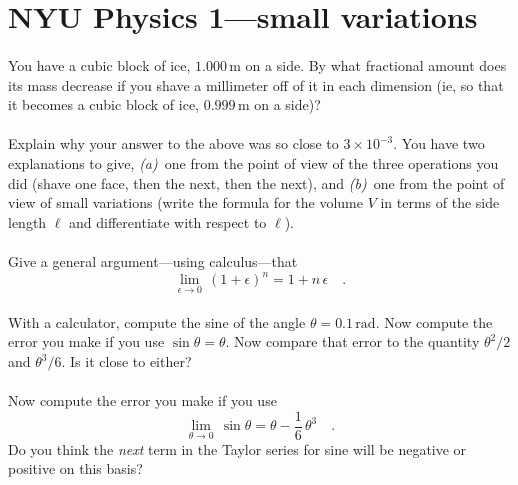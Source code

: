 \documentclass[12pt]{article}
\newcommand{\m}{\mathrm{m}}
\newcommand{\rad}{\mathrm{rad}}
\newcounter{problem}
\begin{document}
\sloppy\sloppypar\raggedbottom\frenchspacing\thispagestyle{empty}

\section*{NYU Physics 1---small variations}

\paragraph{\theproblem}%
You have a cubic block of ice, $1.000\,\m$ on a side.  By what
fractional amount does its mass decrease if you shave a millimeter off
of it in each dimension (ie, so that it becomes a cubic block of ice,
$0.999\,\m$ on a side)?

\paragraph{\theproblem}%
Explain why your answer to the above was so close to $3\times
10^{-3}$.  You have two explanations to give, \textsl{(a)}~one from
the point of view of the three operations you did (shave one face,
then the next, then the next), and \textsl{(b)}~one from the point of
view of small variations (write the formula for the volume $V$ in
terms of the side length $\ell$ and differentiate with respect to
$\ell$).

\paragraph{\theproblem}%
Give a general argument---using calculus---that
\begin{equation}
\lim_{\epsilon\rightarrow 0}\,(1+\epsilon)^n=1+n\,\epsilon \quad .
\end{equation}

\paragraph{\theproblem}%
With a calculator, compute the sine of the angle $\theta=0.1\,\rad$.
Now compute the error you make if you use $\sin\theta=\theta$.  Now
compare that error to the quantity $\theta^2/2$ and $\theta^3/6$.  Is
it close to either?

\paragraph{\theproblem}%
Now compute the error you make if you use
\begin{equation}
\lim_{\theta\rightarrow 0}\,\sin\theta=\theta-\frac{1}{6}\,\theta^3 \quad .
\label{eq:third}
\end{equation}
Do you think the \emph{next} term in the Taylor series for sine will
be negative or positive on this basis?
\end{document}
